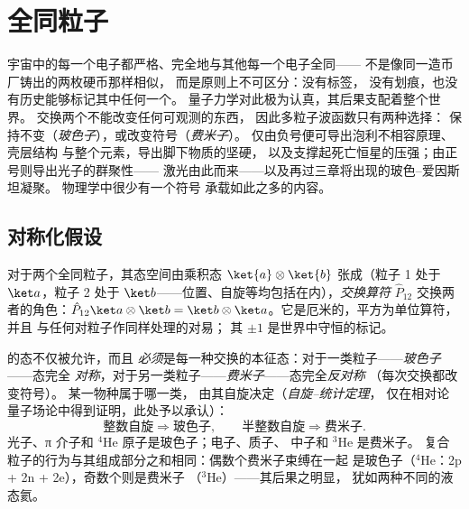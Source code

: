 \chapter{全同粒子}\label{ch:b3:identical-particles}

宇宙中的每一个电子都严格、完全地与其他每一个电子全同——
不是像同一造币厂铸出的两枚硬币那样相似，
而是原则上不可区分：没有标签，
没有划痕，也没有历史能够标记其中任何一个。
量子力学对此极为认真，其后果支配着整个世界。
交换两个不能改变任何可观测的东西，
因此多粒子波函数只有两种选择：
保持不变（\emph{玻色子}），或改变符号（\emph{费米子}）。
仅由负号便可导出泡利不相容原理、壳层结构
与整个元素，导出脚下物质的坚硬，
以及支撑起死亡恒星的压强；由正号则导出光子的群聚性——
激光由此而来——以及再过三章将出现的玻色–爱因斯坦凝聚。
物理学中很少有一个符号
承载如此之多的内容。

\section{对称化假设}

\begin{definition}[交换]\label{def:b3:identical-particles:exchange}
对于两个全同粒子，其态空间由乘积态
$\ket{a}\otimes\ket{b}$ 张成（粒子 1 处于 $\ket a$，粒子 2 处于
$\ket b$——位置、自旋等均包括在内），\emph{交换算符}
$\hat P_{12}$ 交换两者的角色：$\hat P_{12}\ket a\otimes\ket b =
\ket b\otimes\ket a$。它是厄米的，平方为单位算符，并且
与任何对粒子作同样处理的对易；
其 $\pm1$ 是世界中守恒的标记。
\end{definition}

\begin{theorem}[玻色子与费米子]\label{thm:b3:identical-particles:postulate}
的态不仅被允许，而且
\emph{必须}是每一种交换的本征态：对于一类粒子——\emph{玻色子}——态完全
\emph{对称}，对于另一类粒子——\emph{费米子}——态完全\emph{反对称}
（每次交换都改变符号）。
某一物种属于哪一类，
由其自旋决定（\emph{自旋–统计定理}，
仅在相对论量子场论中得到证明，此处予以承认）：
\[
\text{整数自旋} \Rightarrow \text{玻色子} , \qquad
\text{半整数自旋} \Rightarrow \text{费米子} .
\]
光子、π 介子和 $^4$He 原子是玻色子；电子、质子、
中子和 $^3$He 是费米子。
复合粒子的行为与其组成部分之和相同：偶数个费米子束缚在一起
是玻色子（$^4$He：2p + 2n + 2e），奇数个则是费米子
（$^3$He）——其后果之明显，
犹如两种不同的液态氦。
\end{theorem}
\admitted


